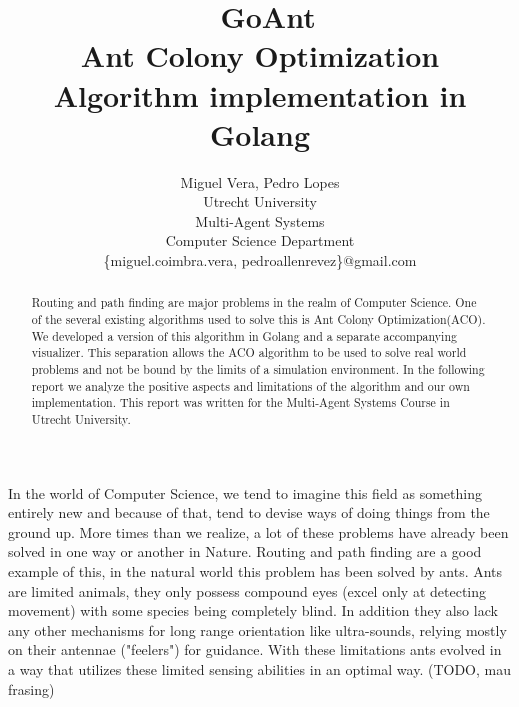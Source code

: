 \documentclass[times, 10pt,twocolumn]{article}
\begin{document}
\title{\ GoAnt\\ Ant Colony Optimization Algorithm implementation in Golang}

			 \author{Miguel Vera, Pedro Lopes\\
				 Utrecht University\\ Multi-Agent Systems \\
                 Computer Science Department\\  
                 \{miguel.coimbra.vera,
				 pedroallenrevez\}@gmail.com }

\maketitle \thispagestyle{empty}

\begin{abstract} 
		Routing and path finding are major problems in the realm of Computer Science. One
	of the several existing algorithms used to solve this is Ant Colony Optimization(ACO). We 
	developed a version of this algorithm in Golang and a separate accompanying visualizer.
	This separation allows the ACO algorithm to be used to solve real world problems and 
	not be bound by the limits of a simulation environment. In the following report we 
	analyze the positive aspects and limitations of the algorithm and our own implementation.
    This report was written for the Multi-Agent Systems Course in Utrecht University.
\end{abstract}

		In the world of Computer Science, we tend to imagine this field as something entirely
	new and because of that, tend to devise ways of doing things from the ground up. More 
	times than we realize, a lot of these problems have already been solved in one way or
	another in Nature. Routing and path finding are a good example of this, in the natural 
	world this problem has been solved by ants. Ants are limited animals, they only possess
    compound eyes (excel only at detecting movement) with some species being completely blind.
    In addition they also lack any other mechanisms for long range orientation like ultra-sounds, 
    relying mostly on their antennae ("feelers") for guidance.
	With these limitations ants evolved in a way that utilizes these limited sensing abilities 
    in an optimal way. (TODO, mau frasing)
\end{document}
